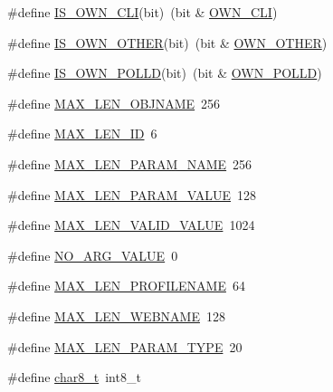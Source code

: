 \begin{DoxyCompactItemize}
\item 
\#define \hyperlink{group__LIBHELP_gab08c7a3f1f53bb297b8898c362247c5c}{I\-S\-\_\-\-O\-W\-N\-\_\-\-C\-L\-I}(bit)~(bit \& \hyperlink{group__LIBHELP_gga3b5e9e55eb7b08d5702a101e529e5507a835c8e2f1c1761f7b6a96741727d034d}{O\-W\-N\-\_\-\-C\-L\-I})
\item 
\#define \hyperlink{group__LIBHELP_ga9dee7b669107a8535d6450b924da3dd5}{I\-S\-\_\-\-O\-W\-N\-\_\-\-O\-T\-H\-E\-R}(bit)~(bit \& \hyperlink{group__LIBHELP_gga3b5e9e55eb7b08d5702a101e529e5507af9c8e0f2e72366671c2313c42146c31c}{O\-W\-N\-\_\-\-O\-T\-H\-E\-R})
\item 
\#define \hyperlink{group__LIBHELP_ga52f319651f13bfc0bf8af07d3ef34066}{I\-S\-\_\-\-O\-W\-N\-\_\-\-P\-O\-L\-L\-D}(bit)~(bit \& \hyperlink{group__LIBHELP_gga3b5e9e55eb7b08d5702a101e529e5507abdc4cf6227f600ff8519e594e91f3b68}{O\-W\-N\-\_\-\-P\-O\-L\-L\-D})
\item 
\#define \hyperlink{group__LIBHELP_ga635a84c0e3ae6e922f824064a006500d}{M\-A\-X\-\_\-\-L\-E\-N\-\_\-\-O\-B\-J\-N\-A\-M\-E}~256
\item 
\#define \hyperlink{group__LIBHELP_ga6f475315cf5d5278cdae2af64471ab80}{M\-A\-X\-\_\-\-L\-E\-N\-\_\-\-I\-D}~6
\item 
\#define \hyperlink{group__LIBHELP_gaac5d922b6e3eb48b7ba829979fd73ae2}{M\-A\-X\-\_\-\-L\-E\-N\-\_\-\-P\-A\-R\-A\-M\-\_\-\-N\-A\-M\-E}~256
\item 
\#define \hyperlink{group__LIBHELP_ga1b79b737d896845c1c07d942ffbfe3fa}{M\-A\-X\-\_\-\-L\-E\-N\-\_\-\-P\-A\-R\-A\-M\-\_\-\-V\-A\-L\-U\-E}~128
\item 
\#define \hyperlink{group__LIBHELP_ga121f77f1d2f8588180ca5a258fe36765}{M\-A\-X\-\_\-\-L\-E\-N\-\_\-\-V\-A\-L\-I\-D\-\_\-\-V\-A\-L\-U\-E}~1024
\item 
\#define \hyperlink{group__LIBHELP_ga7f24a1abca37046fc42297fdefe88335}{N\-O\-\_\-\-A\-R\-G\-\_\-\-V\-A\-L\-U\-E}~0
\item 
\#define \hyperlink{group__LIBHELP_ga7b87580b87e217a2cc87a362a19c91e5}{M\-A\-X\-\_\-\-L\-E\-N\-\_\-\-P\-R\-O\-F\-I\-L\-E\-N\-A\-M\-E}~64
\item 
\#define \hyperlink{group__LIBHELP_gad283ffd6255aeb7b05ce1ed512a81102}{M\-A\-X\-\_\-\-L\-E\-N\-\_\-\-W\-E\-B\-N\-A\-M\-E}~128
\item 
\#define \hyperlink{group__LIBHELP_gac3bbb0c7282c84f7f5fd606f95c22278}{M\-A\-X\-\_\-\-L\-E\-N\-\_\-\-P\-A\-R\-A\-M\-\_\-\-T\-Y\-P\-E}~20
\item 
\#define \hyperlink{group__LIBHELP_ga054e39e306fb3948d07aadf394da2fbf}{char8\-\_\-t}~int8\-\_\-t

\end{DoxyCompactItemize}
